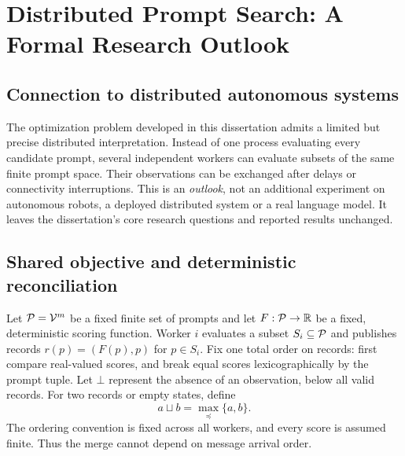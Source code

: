 \chapter{Distributed Prompt Search: A Formal Research Outlook}
\label{app:distributed-prompt-search}

\section{Connection to distributed autonomous systems}
The optimization problem developed in this dissertation admits a limited but
precise distributed interpretation. Instead of one process evaluating every
candidate prompt, several independent workers can evaluate subsets of the
same finite prompt space. Their observations can be exchanged after delays or
connectivity interruptions. This is an \emph{outlook}, not an additional
experiment on autonomous robots, a deployed distributed system or a real
language model. It leaves the dissertation's core research questions and
reported results unchanged.

\section{Shared objective and deterministic reconciliation}
Let $\mathcal P=\mathcal V^m$ be a fixed finite set of prompts and let
$F:\mathcal P\rightarrow\mathbb R$ be a fixed, deterministic scoring function.
Worker $i$ evaluates a subset $S_i\subseteq\mathcal P$ and publishes records
$r(p)=(F(p),p)$ for $p\in S_i$. Fix one total order on records: first
compare real-valued scores, and break equal scores lexicographically by the
prompt tuple. Let $\bot$ represent the absence of an observation, below all
valid records. For two records or empty states, define
\begin{equation}
  a\sqcup b=\max_{\preceq}\{a,b\}.
  \label{eq:distributed-join}
\end{equation}
The ordering convention is fixed across all workers, and every score is
assumed finite. Thus the merge cannot depend on message arrival order.

